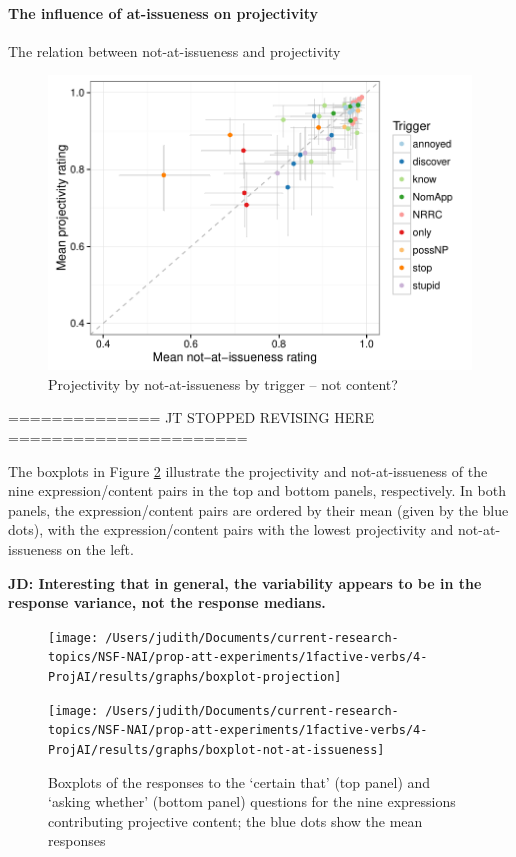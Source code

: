 \documentclass[11pt,fleqn]{article}
\newcommand{\6}{\mbox{$[\hspace*{-.6mm}[$}}
\newcommand{\9}{\mbox{$]\hspace*{-.6mm}]$}}
\begin{document}
\paragraph{The influence of at-issueness on projectivity}

The relation between not-at-issueness and projectivity

\begin{figure}[!h]

\begin{center}
\includegraphics[width=12cm]{../results/exp1a/graphs/ai-proj-bytrigger-nofacets}

\end{center}

\caption{Projectivity by not-at-issueness by trigger -- not content?}\label{f-proj-ai-1a}
\end{figure}

\newpage

============== JT STOPPED REVISING HERE ======================


The boxplots in Figure \ref{f-exp1a} illustrate the projectivity and not-at-issueness of the nine expression/content pairs in the top and bottom panels, respectively. In both panels, the expression/content pairs are ordered by their mean (given by the blue dots), with the expression/content pairs with the lowest projectivity and not-at-issueness on the left. 

{\bf JD: Interesting that in general, the variability appears to be in the response variance, not the response medians.}

\begin{figure}[!h]

\begin{center}
\texttt{[image: /Users/judith/Documents/current-research-topics/NSF-NAI/prop-att-experiments/1factive-verbs/4-ProjAI/results/graphs/boxplot-projection]}

\texttt{[image: /Users/judith/Documents/current-research-topics/NSF-NAI/prop-att-experiments/1factive-verbs/4-ProjAI/results/graphs/boxplot-not-at-issueness]}
\end{center}

\caption{Boxplots of the responses to the `certain that' (top panel) and `asking whether' (bottom panel) questions for the nine expressions contributing projective content; the blue dots show the mean responses}\label{f-exp1a}
\end{figure}
\end{document}
